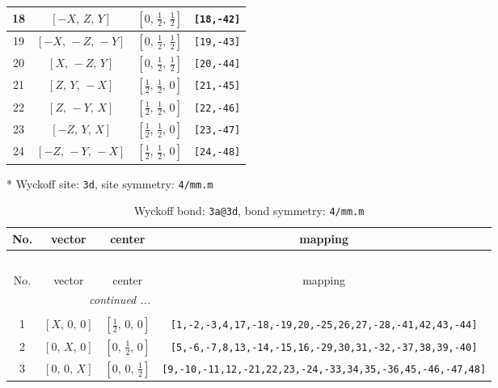 \documentclass[fleqn,8pt]{jsarticle}
\begin{document}
\begin{longtable}{cccc}
18 & $\left[ - X,\, Z,\, Y \right]$ & $\left[ 0,\, \frac{1}{2},\, \frac{1}{2} \right]$ & {\tt [18,-42]} \\ \hline
19 & $\left[ - X,\, - Z,\, - Y \right]$ & $\left[ 0,\, \frac{1}{2},\, \frac{1}{2} \right]$ & {\tt [19,-43]} \\ \hline
20 & $\left[ X,\, - Z,\, Y \right]$ & $\left[ 0,\, \frac{1}{2},\, \frac{1}{2} \right]$ & {\tt [20,-44]} \\ \hline
21 & $\left[ Z,\, Y,\, - X \right]$ & $\left[ \frac{1}{2},\, \frac{1}{2},\, 0 \right]$ & {\tt [21,-45]} \\ \hline
22 & $\left[ Z,\, - Y,\, X \right]$ & $\left[ \frac{1}{2},\, \frac{1}{2},\, 0 \right]$ & {\tt [22,-46]} \\ \hline
23 & $\left[ - Z,\, Y,\, X \right]$ & $\left[ \frac{1}{2},\, \frac{1}{2},\, 0 \right]$ & {\tt [23,-47]} \\ \hline
24 & $\left[ - Z,\, - Y,\, - X \right]$ & $\left[ \frac{1}{2},\, \frac{1}{2},\, 0 \right]$ & {\tt [24,-48]} \\
\end{longtable}
* Wyckoff site: {\tt 3d}, site symmetry: {\tt 4/mm.m}
\renewcommand{\arraystretch}{1.2}
\begin{longtable}{cccc}
\caption{Wyckoff bond: {\tt 3a@3d}, bond symmetry: {\tt 4/mm.m}}
 \\
 \hline \hline
No. & vector & center & mapping \\ \hline \endfirsthead

\multicolumn{3}{l}{\tablename\ \thetable{}} \\
 \hline \hline
No. & vector & center & mapping \\ \hline \endhead

 \hline \hline
\multicolumn{3}{r}{\footnotesize\it continued ...} \\ \endfoot

 \hline \hline
\multicolumn{3}{r}{} \\ \endlastfoot

1 & $\left[ X,\, 0,\, 0 \right]$ & $\left[ \frac{1}{2},\, 0,\, 0 \right]$ & {\tt [1,-2,-3,4,17,-18,-19,20,-25,26,27,-28,-41,42,43,-44]} \\ \hline
2 & $\left[ 0,\, X,\, 0 \right]$ & $\left[ 0,\, \frac{1}{2},\, 0 \right]$ & {\tt [5,-6,-7,8,13,-14,-15,16,-29,30,31,-32,-37,38,39,-40]} \\ \hline
3 & $\left[ 0,\, 0,\, X \right]$ & $\left[ 0,\, 0,\, \frac{1}{2} \right]$ & {\tt [9,-10,-11,12,-21,22,23,-24,-33,34,35,-36,45,-46,-47,48]} \\
\end{longtable}
\end{document}
